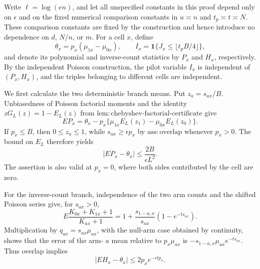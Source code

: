 Write \(\ell=\log(en)\), and let all unspecified constants in this
proof depend only on \(\epsilon\) and on the fixed numerical comparison
constants in \(u\asymp n\) and \(t_p\asymp t\asymp N\).  These
comparison constants are fixed by the construction and hence introduce
no dependence on \(d\), \(N/n\), or \(m\).  For a cell \(x\), define
\[
 \theta_x=p_x(\mu_{1x}-\mu_{0x}),\qquad
 I_x=\mathbf 1\{J_x\le \lfloor t_pB/4\rfloor\},
\]
and denote its polynomial and inverse-count statistics by \(P_x\) and
\(H_x\), respectively.  By the independent Poisson construction, the
pilot variable \(I_x\) is independent of \((P_x,H_x)\), and the triples
belonging to different cells are independent.

We first calculate the two deterministic branch means.  Put
\(z_a=s_{ax}/B\).  Unbiasedness of Poisson factorial moments and the
identity \(zG_L(z)=1-E_L(z)\) from
\(\mathrm{lem:chebyshev\mbox{-}factorial\mbox{-}certificate}\) give
\[
 EP_x=\theta_x-p_x\{\mu_{1x}E_L(z_1)-\mu_{0x}E_L(z_0)\}.
 \tag{4}
\]
If \(p_x\le B\), then \(0\le z_a\le1\), while
\(s_{ax}\ge\epsilon p_x\) by \(\mathrm{ass:overlap}\) whenever
\(p_x>0\).  The bound on \(E_L\) therefore yields
\[
 |EP_x-\theta_x|\le \frac{2B}{\epsilon L^2}.
 \tag{5}
\]
The assertion is also valid at \(p_x=0\), where both sides contributed
by the cell are zero.

For the inverse-count branch, independence of the two arm counts and
the shifted Poisson series give, for \(s_{ax}>0\),
\[
 E\frac{K_{0x}+K_{1x}+1}{K_{ax}+1}
 =1+\frac{s_{1-a,x}}{s_{ax}}(1-e^{-ts_{ax}}).
\]
Multiplication by \(q_{ax}=s_{ax}\mu_{ax}\), with the null-arm case
obtained by continuity, shows that the error of the arm-
\(a\) mean relative to \(p_x\mu_{ax}\) is
\(-s_{1-a,x}\mu_{ax}e^{-ts_{ax}}\).  Thus overlap implies
\[
 |EH_x-\theta_x|\le2p_xe^{-\epsilon tp_x}.
 \tag{6}
\]


